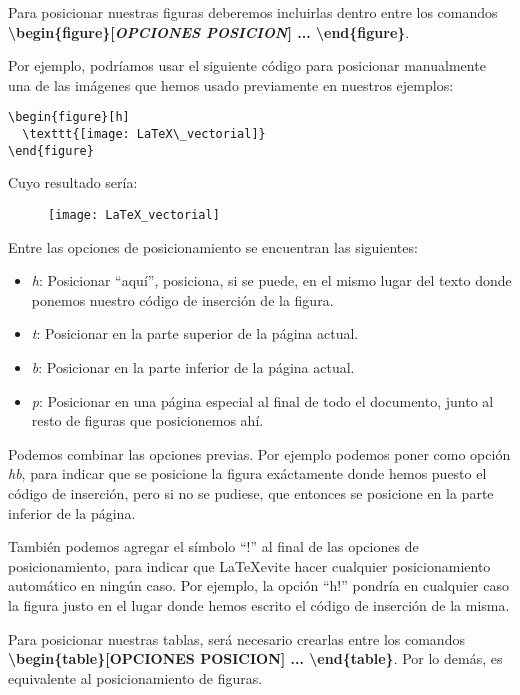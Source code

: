 Para posicionar nuestras figuras deberemos incluirlas dentro entre los comandos \textbf{\textbackslash begin\{figure\}[\emph{OPCIONES POSICION}] ... \textbackslash end\{figure\}}.

Por ejemplo, podríamos usar el siguiente código para posicionar manualmente una de las imágenes que hemos usado previamente en nuestros ejemplos:

\begin{lstlisting}[language={[LaTeX]Tex}]
\begin{figure}[h]
  \texttt{[image: LaTeX\_vectorial]}	
\end{figure}
\end{lstlisting}

Cuyo resultado sería:

\begin{figure}[h]
	\texttt{[image: LaTeX\_vectorial]}	
\end{figure}

Entre las opciones de posicionamiento se encuentran las siguientes:

\begin{itemize}
	\item \emph{h}: Posicionar ``aquí'', posiciona, si se puede, en el mismo lugar del texto donde ponemos nuestro código de inserción de la figura.
	\item \emph{t}: Posicionar en la parte superior de la página actual.
	\item \emph{b}: Posicionar en la parte inferior de la página actual.
	\item \emph{p}: Posicionar en una página especial al final de todo el documento, junto al resto de figuras que posicionemos ahí.
\end{itemize}

Podemos combinar las opciones previas. Por ejemplo podemos poner como opción \emph{hb}, para indicar que se posicione la figura exáctamente donde hemos puesto el código de inserción, pero si no se pudiese, que entonces se posicione en la parte inferior de la página.

También podemos agregar el símbolo ``!'' al final de las opciones de posicionamiento, para indicar que \LaTeX evite hacer cualquier posicionamiento automático en ningún caso. Por ejemplo, la opción ``h!'' pondría en cualquier caso la figura justo en el lugar donde hemos escrito el código de inserción de la misma.

Para posicionar nuestras tablas, será necesario crearlas entre los comandos \textbf{\textbackslash begin\{table\}[OPCIONES POSICION] ... \textbackslash end\{table\}}. Por lo demás, es equivalente al posicionamiento de figuras.

